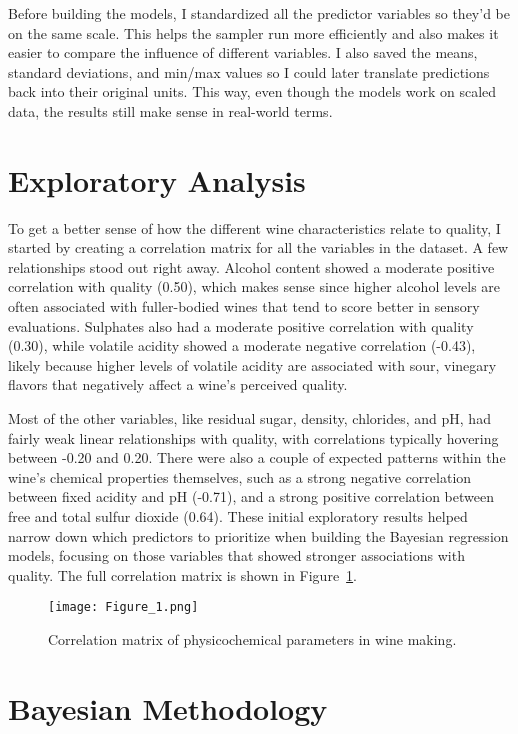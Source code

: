\documentclass[12pt]{article}
\begin{document}
Before building the models, I standardized all the predictor variables so they’d be on the same scale. This helps the sampler run more efficiently and also makes it easier to compare the influence of different variables. I also saved the means, standard deviations, and min/max values so I could later translate predictions back into their original units. This way, even though the models work on scaled data, the results still make sense in real-world terms.

\section{Exploratory Analysis}

To get a better sense of how the different wine characteristics relate to quality, I started by creating a correlation matrix for all the variables in the dataset. A few relationships stood out right away. Alcohol content showed a moderate positive correlation with quality (0.50), which makes sense since higher alcohol levels are often associated with fuller-bodied wines that tend to score better in sensory evaluations. Sulphates also had a moderate positive correlation with quality (0.30), while volatile acidity showed a moderate negative correlation (-0.43), likely because higher levels of volatile acidity are associated with sour, vinegary flavors that negatively affect a wine’s perceived quality.

Most of the other variables, like residual sugar, density, chlorides, and pH, had fairly weak linear relationships with quality, with correlations typically hovering between -0.20 and 0.20. There were also a couple of expected patterns within the wine’s chemical properties themselves, such as a strong negative correlation between fixed acidity and pH (-0.71), and a strong positive correlation between free and total sulfur dioxide (0.64). These initial exploratory results helped narrow down which predictors to prioritize when building the Bayesian regression models, focusing on those variables that showed stronger associations with quality. The full correlation matrix is shown in Figure~\ref{fig:Figure_1}.

\begin{figure}[h]
\centering
\texttt{[image: Figure\_1.png]}
\caption{\label{fig:Figure_1}Correlation matrix of physicochemical parameters in wine making.}
\end{figure}

\section{Bayesian Methodology}
\end{document}
